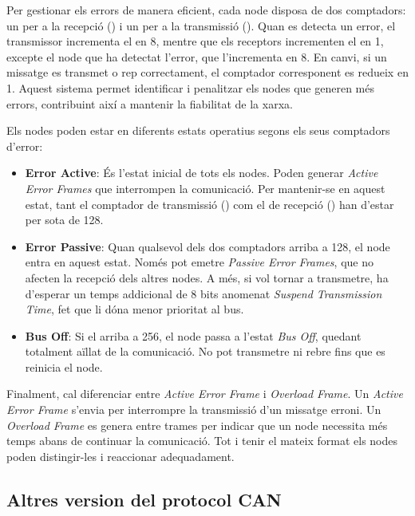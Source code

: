 \documentclass{tfgitic}[2024/07/01]
\begin{document}
 Per gestionar els errors de manera eficient, cada node  disposa de dos comptadors: un per a la recepció () i un per a la transmissió (). 
 Quan es detecta un error, el transmissor incrementa el  en 8, mentre que els receptors incrementen el  en 1, excepte el node que ha detectat l'error, 
 que l'incrementa en 8. En canvi, si un missatge es transmet o rep correctament, el comptador corresponent es redueix en 1. Aquest sistema permet identificar 
 i penalitzar els nodes que generen més errors, contribuint així a mantenir la fiabilitat de la xarxa.

Els nodes  poden estar en diferents estats operatius segons els seus comptadors d'error:

\begin{itemize}
  \item \textbf{Error Active}: És l'estat inicial de tots els nodes. Poden generar \textit{Active Error Frames} que interrompen la comunicació. Per mantenir-se en aquest 
  estat, tant el comptador de transmissió () com el de recepció () han d'estar per sota de 128.

  \item \textbf{Error Passive}: Quan qualsevol dels dos comptadors arriba a 128, el node entra en aquest estat. Només pot emetre 
  \textit{Passive Error Frames}, que no afecten la recepció dels altres nodes. A més, si vol tornar a transmetre, ha d'esperar un temps addicional de 8 bits 
  anomenat \textit{Suspend Transmission Time}, fet que li dóna menor prioritat al bus.

  \item \textbf{Bus Off}: Si el  arriba a 256, el node passa a l'estat \textit{Bus Off}, quedant totalment aïllat de la comunicació. No pot transmetre ni rebre 
  fins que es reinicia el node.
\end{itemize} 

Finalment, cal diferenciar entre \textit{Active Error Frame} i \textit{Overload Frame}. Un \textit{Active Error Frame} s'envia per interrompre la transmissió d'un missatge erroni.
Un \textit{Overload Frame} es genera entre trames per indicar que un node necessita més temps abans de continuar la comunicació. Tot i tenir el mateix format 
els nodes poden distingir-les i reaccionar adequadament.

\subsection{Altres version del protocol CAN}
\end{document}
